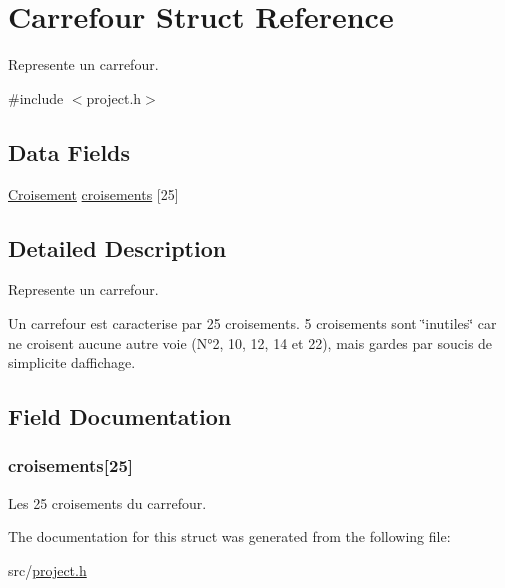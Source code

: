 \hypertarget{struct_carrefour}{}\section{Carrefour Struct Reference}
\label{struct_carrefour}


Represente un carrefour.  




{\ttfamily \#include $<$project.\+h$>$}

\subsection*{Data Fields}
\begin{DoxyCompactItemize}
\item 
\hyperlink{struct_croisement}{Croisement} \hyperlink{struct_carrefour_a5d7ea25dcaf01a3bf1fd06656e609062}{croisements} \mbox{[}25\mbox{]}
\end{DoxyCompactItemize}


\subsection{Detailed Description}
Represente un carrefour. 

Un carrefour est caracterise par 25 croisements. 5 croisements sont \char`\"{}inutiles\char`\"{} car ne croisent aucune autre voie (N°2, 10, 12, 14 et 22), mais gardes par soucis de simplicite d\textquotesingle{}affichage. 

\subsection{Field Documentation}
\hypertarget{struct_carrefour_a5d7ea25dcaf01a3bf1fd06656e609062}{}
\subsubsection[{croisements}]{ croisements\mbox{[}25\mbox{]}}\label{struct_carrefour_a5d7ea25dcaf01a3bf1fd06656e609062}
Les 25 croisements du carrefour. 

The documentation for this struct was generated from the following file\+:\begin{DoxyCompactItemize}
\item 
src/\hyperlink{project_8h}{project.\+h}\end{DoxyCompactItemize}
